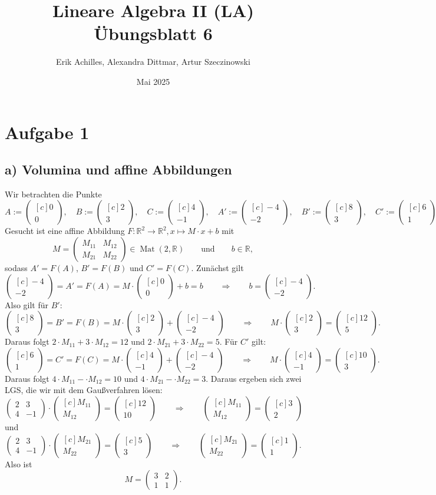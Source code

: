 \documentclass{article}
\title{Lineare Algebra II (LA) Übungsblatt 6}
\author{Erik Achilles, Alexandra Dittmar, Artur Szeczinowski}
\date{Mai 2025}
\newcommand{\RR}{\mathbb{R}}
\newcommand{\imp}{\mathbb{\Rightarrow}}
\DeclareMathOperator{\Mat}{Mat}
\newcommand{\vect}[1]{\begin{pmatrix*}[c] #1 \end{pmatrix*}}
\newcommand{\legs}[2]{\left(\begin{array}{#1}#2\end{array}\right)}
\begin{document}

\section*{Aufgabe 1}
\subsection*{a) Volumina und affine Abbildungen}

Wir betrachten die Punkte
\[
A := \vect{0\\0}, \quad
B := \vect{2\\3}, \quad
C := \vect{4\\-1}, \quad
A' := \vect{-4\\-2}, \quad
B' := \vect{8\\3}, \quad
C' := \vect{6\\1}
\in \RR^2.
\]
Gesucht ist eine affine Abbildung
$F: \RR^2 \to \RR^2, x \mapsto M \cdot x + b$
mit
\[
M = \legs{cc}{ M_{11} & M_{12} \\ M_{21} & M_{22} }
\in \Mat(2,\RR) \qquad\text{und}\qquad b \in \RR,
\]
sodass $A' = F(A)$, $B' = F(B)$ und $C' = F(C)$.
Zunächst gilt
\[
\vect{-4\\-2} = A' = F(A) = M \cdot \vect{0\\0} + b = b
\qquad\imp\qquad
b = \vect{-4\\-2}.
\]
Also gilt für $B'$:
\[
\vect{8\\3} = B' = F(B) = M \cdot \vect{2\\3} + \vect{-4\\-2}
\qquad\imp\qquad
M \cdot \vect{2\\3} = \vect{12\\5}.
\]
Daraus folgt
$2 \cdot M_{11} + 3 \cdot M_{12} = 12$
und
$2 \cdot M_{21} + 3 \cdot M_{22} = 5$.
Für $C'$ gilt:
\[
\vect{6\\1} = C' = F(C) = M \cdot \vect{4\\-1} + \vect{-4\\-2}
\qquad\imp\qquad
M \cdot \vect{4\\-1} = \vect{10\\3}.
\]
Daraus folgt
$4 \cdot M_{11} - \cdot M_{12} = 10$
und
$4 \cdot M_{21} - \cdot M_{22} = 3$.
Daraus ergeben sich zwei LGS, die wir mit dem Gaußverfahren lösen:
\[
\legs{cc}{2 & 3 \\ 4 & -1} \cdot \vect{M_{11} \\ M_{12}}= \vect{12 \\ 10}
\qquad\imp\qquad
\vect{M_{11} \\ M_{12}} = \vect{3 \\ 2}
\]
und
\[
\legs{cc}{2 & 3 \\ 4 & -1} \cdot \vect{M_{21} \\ M_{22}}= \vect{5 \\ 3}
\qquad\imp\qquad
\vect{M_{21} \\ M_{22}} = \vect{1 \\ 1}.
\]
Also ist 
\[
M = \legs{cc}{3 & 2 \\ 1 & 1}.
\]
\end{document}
